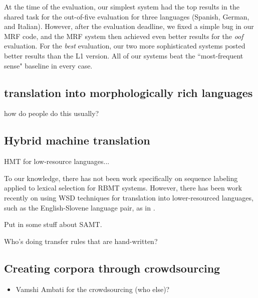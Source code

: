 At the time of the evaluation, our simplest system had the top results in the
shared task for the out-of-five evaluation for three languages (Spanish,
German, and Italian).  However, after the evaluation deadline, we fixed a
simple bug in our MRF code, and the MRF system then achieved even better
results for the \emph{oof} evaluation. For the \emph{best} evaluation, our two
more sophisticated systems posted better results than the L1 version. All of
our systems beat the ``most-frequent sense" baseline in every case.



\subsection{translation into morphologically rich languages}

how do people do this usually?


\subsection{Hybrid machine translation}
HMT for low-resource languages...

To our knowledge, there has not been work specifically on sequence labeling
applied to lexical selection for RBMT systems. However, 
there has been work recently on using WSD techniques for translation into
lower-resourced languages, such as the English-Slovene language pair, as in 
\cite{vintar-fivser-vrvsvcaj:2012:ESIRMT-HyTra2012}. 


Put in some stuff about SAMT.

Who's doing transfer rules that are hand-written?

\subsection{Creating corpora through crowdsourcing}

\begin{itemize}
  \item Vamshi Ambati for the crowdsourcing (who else)?
\end{itemize}


\cite{ambati_naacl}

\cite{ambati_act}

